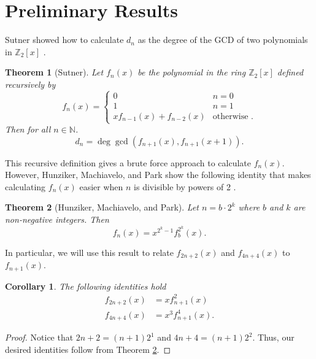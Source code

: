 \documentclass[a4paper]{article}
\newtheorem{theorem}{Theorem}
\newtheorem{corollary}{Corollary}
\newcommand{\Z}{\mathbb{Z}}
\newcommand{\N}{\mathbb{N}}
\begin{document}
	\section{Preliminary Results}
	Sutner showed how to calculate $d_n$ as the degree of the GCD of two polynomials in $\Z_2[x]$ \cite{Sutner96sigma-automataand}.
	
	\begin{theorem}[Sutner]\label{Sutner_gcd}
		Let $f_n(x)$ be the polynomial in the ring $\Z_2[x]$ defined recursively by
		\begin{equation*}
			f_n(x) = \begin{cases}
				0 & n=0 \\
				1 & n=1 \\
				xf_{n-1}(x) + f_{n-2}(x) & \text{otherwise }.
			\end{cases}
		\end{equation*}
		Then for all $n \in \N$.
		\begin{equation*}
			d_n = \deg{\gcd\left(f_{n+1}(x), f_{n+1}(x+1)\right)}.
		\end{equation*}
	\end{theorem}

	This recursive definition gives a brute force approach to calculate $f_n(x)$.
	However, Hunziker, Machiavelo, and Park show the following identity that makes calculating $f_n(x)$ easier when $n$ is divisible by powers of 2 \cite{HUNZIKER2004465}.
	
	\begin{theorem}[Hunziker, Machiavelo, and Park]\label{HMP_identity}
		Let $n = b\cdot2^{k}$ where $b$ and $k$ are non-negative integers.
		Then
		\begin{equation*}
			f_n(x) = x^{2^{k}-1} f_{b}^{2^{k}}(x).
		\end{equation*}
	\end{theorem}

	In particular, we will use this result to relate $f_{2n+2}(x)$ and $f_{4n+4}(x)$ to $f_{n+1}(x)$.
	\begin{corollary}\label{cor1}
		The following identities hold
		\begin{align*}
			f_{2n+2}(x) &= xf_{n+1}^2(x) \\
			f_{4n+4}(x) &= x^3f_{n+1}^4(x).
		\end{align*}
	\end{corollary}
	\begin{proof}
		Notice that $2n+2 = (n+1)2^1$ and $4n+4 = (n+1)2^{2}$.
		Thus, our desired identities follow from Theorem \ref{HMP_identity}.
	\end{proof}
\end{document}
